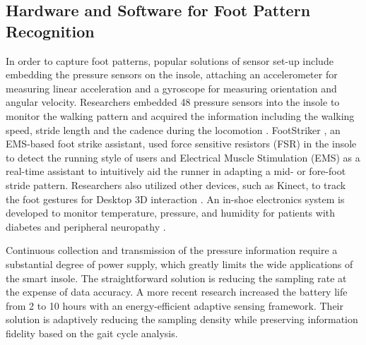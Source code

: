 \documentclass[review]{vgtc}                 %
\begin{document}
\subsection{Hardware and Software for Foot Pattern Recognition} 
In order to capture foot patterns, popular solutions of sensor set-up include embedding the pressure sensors on the insole, attaching an accelerometer for measuring linear acceleration and a gyroscope for measuring orientation and angular velocity. 
Researchers embedded 48 pressure sensors into the insole to monitor the walking pattern and acquired the information including the walking speed, stride length and the cadence during the locomotion \cite{xu2012smart}. 
FootStriker \cite{daiber2017footstriker}, an EMS-based foot strike assistant, used force sensitive resistors (FSR) in the insole to detect the running style of users and Electrical Muscle Stimulation (EMS) as a real-time assistant to intuitively aid the runner in adapting a mid- or fore-foot stride pattern. 
Researchers also utilized other devices, such as Kinect, to track the foot gestures for Desktop 3D interaction \cite{simeone2014feet,velloso2015interactions}.
An in-shoe electronics system is developed to monitor temperature, pressure, and humidity for patients with diabetes and peripheral neuropathy \cite{morley2001shoe}.

Continuous collection and transmission of the pressure information require a substantial degree of power supply, which greatly limits the wide applications of the smart insole. 
The straightforward solution is reducing the sampling rate at the expense of data accuracy. 
A more recent research \cite{wu2015energy} increased the battery life from 2 to 10 hours with an energy-efficient adaptive sensing framework.
Their solution is adaptively reducing the sampling density while preserving information fidelity based on the gait cycle analysis. 
\end{document}

